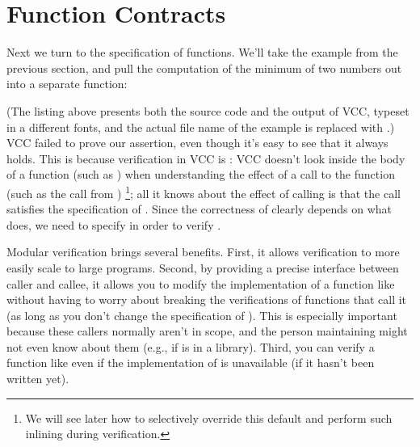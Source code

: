 \section{Function Contracts}
\label{sect:functions}

Next we turn to the specification of functions. We'll take the example
from the previous section, and pull the computation of the minimum of
two numbers out into a separate function:


(The listing above presents both the source code and the output
of VCC, typeset in a different fonts, and 
the actual file name of the example is replaced with .)
VCC failed to prove our assertion, even though it's easy to see that
it always holds. This is because verification in VCC is : 
VCC doesn't look inside the body of a function (such as ) 
when understanding the effect of a call to the function (such as 
the call from )%
\footnote{We will see later how to selectively override this default
  and perform such inlining during verification.}; 
all it knows about the effect of calling  is that the call 
satisfies the specification of . 
Since the correctness of  clearly depends on what 
does, we need to specify  in order to verify .

Modular verification brings several benefits. 
First, it allows verification to more easily scale to
large programs. Second, by providing a precise interface between
caller and callee, it allows you to modify the implementation of
a function like  without having to worry about breaking the
verifications of functions that call it (as long as you don't change
the specification of ). This is especially important
because these callers normally aren't in scope, and the person
maintaining  might not even know about them (e.g., if
 is in a library). Third, you can verify a function like
 even if the implementation of  is unavailable
(\eg if it hasn't been written yet). 


